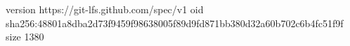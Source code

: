 version https://git-lfs.github.com/spec/v1
oid sha256:48801a8dba2d73f9459f98638005f89d9fd871bb380d32a60b702c6b4fc51f9f
size 1380
